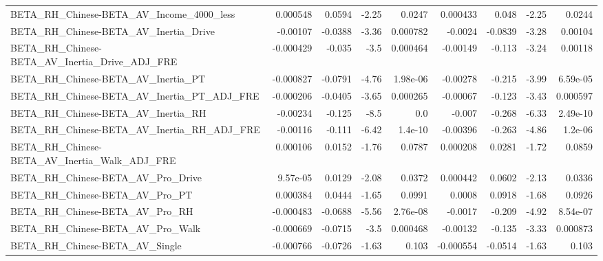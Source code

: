 \begin{tabular}{lrrrrrrrr}
BETA\_RH\_Chinese-BETA\_AV\_Income\_4000\_less           &    0.000548 &       0.0594 &    -2.25 &   0.0247 &   0.000433 &       0.048 &        -2.25 &        0.0244 \\
BETA\_RH\_Chinese-BETA\_AV\_Inertia\_Drive              &    -0.00107 &      -0.0388 &    -3.36 & 0.000782 &    -0.0024 &     -0.0839 &        -3.28 &       0.00104 \\
BETA\_RH\_Chinese-BETA\_AV\_Inertia\_Drive\_ADJ\_FRE      &   -0.000429 &       -0.035 &     -3.5 & 0.000464 &   -0.00149 &      -0.113 &        -3.24 &       0.00118 \\
BETA\_RH\_Chinese-BETA\_AV\_Inertia\_PT                 &   -0.000827 &      -0.0791 &    -4.76 & 1.98e-06 &   -0.00278 &      -0.215 &        -3.99 &      6.59e-05 \\
BETA\_RH\_Chinese-BETA\_AV\_Inertia\_PT\_ADJ\_FRE         &   -0.000206 &      -0.0405 &    -3.65 & 0.000265 &   -0.00067 &      -0.123 &        -3.43 &      0.000597 \\
BETA\_RH\_Chinese-BETA\_AV\_Inertia\_RH                 &    -0.00234 &       -0.125 &     -8.5 &      0.0 &     -0.007 &      -0.268 &        -6.33 &      2.49e-10 \\
BETA\_RH\_Chinese-BETA\_AV\_Inertia\_RH\_ADJ\_FRE         &    -0.00116 &       -0.111 &    -6.42 &  1.4e-10 &   -0.00396 &      -0.263 &        -4.86 &       1.2e-06 \\
BETA\_RH\_Chinese-BETA\_AV\_Inertia\_Walk\_ADJ\_FRE       &    0.000106 &       0.0152 &    -1.76 &   0.0787 &   0.000208 &      0.0281 &        -1.72 &        0.0859 \\
BETA\_RH\_Chinese-BETA\_AV\_Pro\_Drive                  &    9.57e-05 &       0.0129 &    -2.08 &   0.0372 &   0.000442 &      0.0602 &        -2.13 &        0.0336 \\
BETA\_RH\_Chinese-BETA\_AV\_Pro\_PT                     &    0.000384 &       0.0444 &    -1.65 &   0.0991 &     0.0008 &      0.0918 &        -1.68 &        0.0926 \\
BETA\_RH\_Chinese-BETA\_AV\_Pro\_RH                     &   -0.000483 &      -0.0688 &    -5.56 & 2.76e-08 &    -0.0017 &      -0.209 &        -4.92 &      8.54e-07 \\
BETA\_RH\_Chinese-BETA\_AV\_Pro\_Walk                   &   -0.000669 &      -0.0715 &     -3.5 & 0.000468 &   -0.00132 &      -0.135 &        -3.33 &      0.000873 \\
BETA\_RH\_Chinese-BETA\_AV\_Single                     &   -0.000766 &      -0.0726 &    -1.63 &    0.103 &  -0.000554 &     -0.0514 &        -1.63 &         0.103 \\

\end{tabular}
